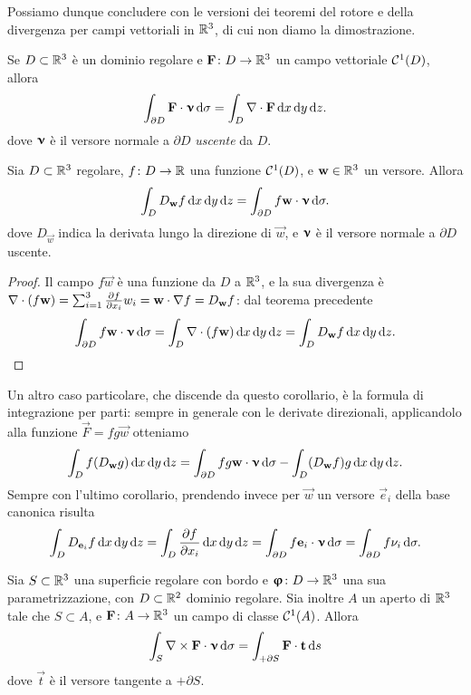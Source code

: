Possiamo dunque concludere con le versioni dei teoremi del rotore e della divergenza per campi vettoriali in $\mathbb{R}^3$, di cui non diamo la dimostrazione.
\begin{teorema} \label{t:divergenza-R3}
	Se $D\subset\mathbb{R}^3$ è un dominio regolare e $\mathbf{F}\colon D\to\mathbb{R}^3$ un campo vettoriale $\mathcal{C}^{{1}}(D)$, allora
	\begin{equation}
		\int_{\partial D}{\mathbf{F}}\cdot{\bm{\upnu}}\,\textup{d}\sigma=\int_D\nabla\cdot\mathbf{F}\,\textup{d} x\,\textup{d} y\,\textup{d} z.
		\label{eq:divergenza-R3}
	\end{equation}
	dove $\bm{\upnu}$ è il versore normale a $\partial D$ \emph{uscente} da $D$.
\end{teorema}
\begin{corollario}
	Sia $D\subset\mathbb{R}^3$ regolare, $f\colon D\to\mathbb{R}$ una funzione $\mathcal{C}^{{1}}(D)$, e $\mathbf{w}\in\mathbb{R}^3$ un versore.
	Allora
	\begin{equation}
		\int_DD_{\mathbf{w}}f\,\textup{d} x\,\textup{d} y\,\textup{d} z=\int_{\partial D}f{\mathbf{w}}\cdot{\bm{\upnu}}\,\textup{d}\sigma.
	\end{equation}
	dove $D_{\vec w}$ indica la derivata lungo la direzione di $\vec w$, e $\bm{\upnu}$ è il versore normale a $\partial D$ uscente.
\end{corollario}
\begin{proof}
	Il campo $f\vec w$ è una funzione da $D$ a $\mathbb{R}^3$, e la sua divergenza è $\nabla\cdot(f\mathbf{w})=\sum_{i=1}^3\frac{\partial {f}}{\partial {x_i}}w_i={\mathbf{w}}\cdot{\nabla f}=D_{\mathbf{w}}f$: dal teorema precedente
	\begin{equation}
		\int_{\partial D}{f\mathbf{w}}\cdot{\bm{\upnu}}\,\textup{d}\sigma=\int_D\nabla\cdot(f\mathbf{w})\,\textup{d} x\,\textup{d} y\,\textup{d} z=\int_DD_{\mathbf{w}}f\,\textup{d} x\,\textup{d} y\,\textup{d} z.\qedhere
	\end{equation}
\end{proof}
Un altro caso particolare, che discende da questo corollario, è la formula di integrazione per parti: sempre in generale con le derivate direzionali, applicandolo alla funzione $\vec F=fg\vec w$ otteniamo
\begin{equation}
	\int_Df(D_{\mathbf{w}}g)\,\textup{d} x\,\textup{d} y\,\textup{d} z=\int_{\partial D}fg{\mathbf{w}}\cdot{\bm{\upnu}}\,\textup{d}\sigma-\int_D(D_{\mathbf{w}}f)g\,\textup{d} x\,\textup{d} y\,\textup{d} z.
\end{equation}
Sempre con l'ultimo corollario, prendendo invece per $\vec w$ un versore $\vec e_i$ della base canonica risulta
\begin{equation}
	\int_DD_{\mathbf{e}_i}f\,\textup{d} x\,\textup{d} y\,\textup{d} z=\int_D\frac{\partial {f}}{\partial {x_i}}\,\textup{d} x\,\textup{d} y\,\textup{d} z=\int_{\partial D}{f\mathbf{e}_i}\cdot{\bm{\upnu}}\,\textup{d}\sigma=\int_{\partial D}f\nu_i\,\textup{d}\sigma.
\end{equation}
\begin{teorema} \label{t:rotore-R3}
	Sia $S\subset\mathbb{R}^3$ una superficie regolare con bordo e $\bm{\upvarphi}\colon D\to\mathbb{R}^3$ una sua parametrizzazione, con $D\subset\mathbb{R}^2$ dominio regolare.
	Sia inoltre $A$ un aperto di $\mathbb{R}^3$ tale che $S\subset A$, e $\mathbf{F}\colon A\to\mathbb{R}^3$ un campo di classe $\mathcal{C}^{{1}}(A)$.
	Allora
	\begin{equation}
		\int_S{\nabla\times\mathbf{F}}\cdot{\bm{\upnu}}\,\textup{d}\sigma=\int_{+\partial S}{\mathbf{F}}\cdot{\mathbf{t}}\,\textup{d} s
		\label{eq:rotore-R3}
	\end{equation}
	dove $\vec t$ è il versore tangente a $+\partial S$.
\end{teorema}
